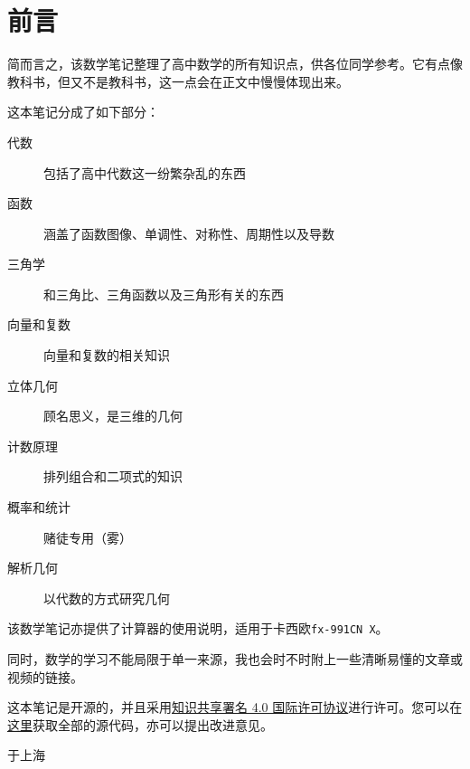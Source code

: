 \section*{前言}
简而言之，该数学笔记整理了高中数学的所有知识点，供各位同学参考。它有点像教科书，但又不是教科书，这一点会在正文中慢慢体现出来。

这本笔记分成了如下部分：

\begin{description}
	\item[代数] 包括了高中代数这一纷繁杂乱的东西
	\item[函数] 涵盖了函数图像、单调性、对称性、周期性以及导数
	\item[三角学] 和三角比、三角函数以及三角形有关的东西
	\item[向量和复数] 向量和复数的相关知识
	\item[立体几何] 顾名思义，是三维的几何
	\item[计数原理] 排列组合和二项式的知识
	\item[概率和统计] 赌徒专用（雾）
	\item[解析几何] 以代数的方式研究几何
\end{description}

该数学笔记亦提供了计算器的使用说明，适用于卡西欧\verb|fx-991CN X|。

同时，数学的学习不能局限于单一来源，我也会时不时附上一些清晰易懂的文章或视频的链接。

这本笔记是开源的，并且采用\href{https://creativecommons.org/licenses/by/4.0}{知识共享署名 4.0 国际许可协议}进行许可。您可以在\href{https://github.com/jason-bowen-zheng/math-notes}{这里}获取全部的源代码，亦可以提出改进意见。
\hypersetup{hidelinks}

\begin{flushright}
	\date{2022年11月}于上海
\end{flushright}
